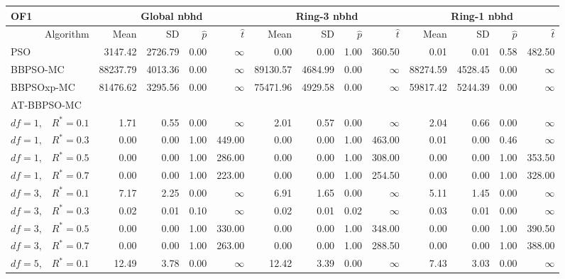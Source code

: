 \documentclass[12pt]{article}
\begin{document}
\begin{table}[ht]
\centering
\tiny{
\begin{tabular}{r|rrrr|rrrr|rrrr}
\multicolumn{1}{l}{OF1} & \multicolumn{4}{c}{Global nbhd} & \multicolumn{4}{c}{Ring-3 nbhd} & \multicolumn{4}{c}{Ring-1 nbhd}\\
\hline
Algorithm & Mean & SD & $\widehat{p}$ & $\widehat{t}$ & Mean & SD & $\widehat{p}$ & $\widehat{t}$ & Mean & SD & $\widehat{p}$ & $\widehat{t}$ \\
  \hline
\multicolumn{1}{l|}{PSO} & 3147.42 & 2726.79 & 0.00 & $\infty$ & 0.00 & 0.00 & 1.00 & 360.50 & 0.01 & 0.01 & 0.58 & 482.50 \\ 
  \multicolumn{1}{l|}{BBPSO-MC} & 88237.79 & 4013.36 & 0.00 & $\infty$ & 89130.57 & 4684.99 & 0.00 & $\infty$ & 88274.59 & 4528.45 & 0.00 & $\infty$ \\ 
  \multicolumn{1}{l|}{BBPSOxp-MC} & 81476.62 & 3295.56 & 0.00 & $\infty$ & 75471.96 & 4929.58 & 0.00 & $\infty$ & 59817.42 & 5244.39 & 0.00 & $\infty$ \\ 
\hline
\multicolumn{1}{l|}{AT-BBPSO-MC} &&&&&&&&&&&&\\
  $df = 1,\enspace$ $R^* =0.1$ & 1.71 & 0.55 & 0.00 & $\infty$ & 2.01 & 0.57 & 0.00 & $\infty$ & 2.04 & 0.66 & 0.00 & $\infty$ \\ 
  $df = 1,\enspace$ $R^* =0.3$ & 0.00 & 0.00 & 1.00 & 449.00 & 0.00 & 0.00 & 1.00 & 463.00 & 0.01 & 0.00 & 0.46 & $\infty$ \\ 
  $df = 1,\enspace$ $R^* =0.5$ & 0.00 & 0.00 & 1.00 & 286.00 & 0.00 & 0.00 & 1.00 & 308.00 & 0.00 & 0.00 & 1.00 & 353.50 \\ 
  $df = 1,\enspace$ $R^* =0.7$ & 0.00 & 0.00 & 1.00 & 223.00 & 0.00 & 0.00 & 1.00 & 254.50 & 0.00 & 0.00 & 1.00 & 328.00 \\ 
  $df = 3,\enspace$ $R^* =0.1$ & 7.17 & 2.25 & 0.00 & $\infty$ & 6.91 & 1.65 & 0.00 & $\infty$ & 5.11 & 1.45 & 0.00 & $\infty$ \\ 
  $df = 3,\enspace$ $R^* =0.3$ & 0.02 & 0.01 & 0.10 & $\infty$ & 0.02 & 0.01 & 0.02 & $\infty$ & 0.03 & 0.01 & 0.00 & $\infty$ \\ 
  $df = 3,\enspace$ $R^* =0.5$ & 0.00 & 0.00 & 1.00 & 330.00 & 0.00 & 0.00 & 1.00 & 348.00 & 0.00 & 0.00 & 1.00 & 390.50 \\ 
  $df = 3,\enspace$ $R^* =0.7$ & 0.00 & 0.00 & 1.00 & 263.00 & 0.00 & 0.00 & 1.00 & 288.50 & 0.00 & 0.00 & 1.00 & 388.00 \\ 
  $df = 5,\enspace$ $R^* =0.1$ & 12.49 & 3.78 & 0.00 & $\infty$ & 12.42 & 3.39 & 0.00 & $\infty$ & 7.43 & 3.03 & 0.00 & $\infty$ \\ 

\end{tabular}}
\end{table}
\end{document}
